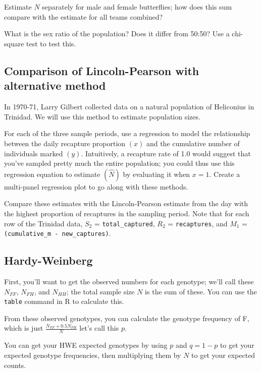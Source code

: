 \documentclass[]{book}
\begin{document}
Estimate \(\hat{N}\) separately for male and female butterflies; how
does this sum compare with the estimate for all teams combined?

What is the sex ratio of the population? Does it differ from 50:50? Use
a chi-square test to test this.

\subsection{Comparison of Lincoln-Pearson with alternative
method}\label{comparison-of-lincoln-pearson-with-alternative-method}

In 1970-71, Larry Gilbert collected data on a natural population of
Heliconius in Trinidad. We will use this method to estimate population
sizes.

For each of the three sample periods, use a regression to model the
relationship between the daily recapture proportion \((x)\) and the
cumulative number of individuals marked \((y)\). Intuitively, a
recapture rate of 1.0 would suggest that you've sampled pretty much the
entire population; you could thus use this regression equation to
estimate \((\hat{N})\) by evaluating it when \(x=1\). Create a
multi-panel regression plot to go along with these methods.

Compare these estimates with the Lincoln-Pearson estimate from the day
with the highest proportion of recaptures in the sampling period. Note
that for each row of the Trinidad data, \(S_2\) =
\texttt{total\_captured}, \(R_2\) = \texttt{recaptures}, and \(M_1\) =
\texttt{(cumulative\_m\ -\ new\_captures)}.

\subsection{Hardy-Weinberg}\label{hardy-weinberg}

First, you'll want to get the observed numbers for each genotype; we'll
call these \(N_{FF}\), \(N_{FH}\), and \(N_{HH}\); the total sample size
\(N\) is the sum of these. You can use the \texttt{table} command in R
to calculate this.

From these observed genotypes, you can calculate the genotype frequency
of F, which is just \(\frac{N_{FF} + 0.5 N_{FH} }{N}\) let's call this
\(p\).

You can get your HWE expected genotypes by using \(p\) and \(q=1-p\) to
get your expected genotype frequencies, then multiplying them by \(N\)
to get your expected counts.
\end{document}

